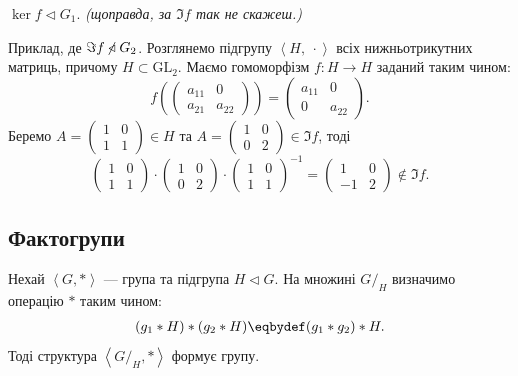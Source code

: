 \documentclass{math_library}
\begin{document}
\begin{corollary}
$\ker f \triangleleft G_1$. \textit{(щоправда, за $\Im f$ так не скажеш.)}
\end{corollary}

\begin{example}
Приклад, де $\Im f \centernot\triangleleft G_2$. Розглянемо підгрупу $\left<H,\ \cdot \right>$ всіх нижньотрикутних матриць, причому $H \subset \mathrm{GL}_2$. Маємо гомоморфізм $f \colon H \to H$ заданий таким чином:
\[
f\left( \begin{pmatrix}
a_{11} & 0 \\
a_{21} & a_{22}
\end{pmatrix} \right) = \begin{pmatrix}
a_{11} & 0 \\
0 & a_{22}
\end{pmatrix}.
\]
Беремо $A = \begin{pmatrix}
1 & 0 \\
1 & 1
\end{pmatrix} \in H$ та $A = \begin{pmatrix}
1 & 0 \\
0 & 2
\end{pmatrix} \in \Im f$, тоді
\[
\begin{pmatrix}
1 & 0 \\
1 & 1
\end{pmatrix} \cdot \begin{pmatrix}
1 & 0 \\
0 & 2
\end{pmatrix} \cdot \begin{pmatrix}
1 & 0 \\
1 & 1
\end{pmatrix}^{-1} = \begin{pmatrix}
1 & 0 \\
-1 & 2
\end{pmatrix} \not \in \Im f.
\]
\end{example}

\subsection{Фактогрупи}
\begin{theorem}
Нехай $\left< G,* \right>$ --- група та підгрупа $H \triangleleft G$. На множині $G/_H$ визначимо операцію $*$ таким чином:
\begin{align*}
(g_1*H) * (g_2*H) \eqbydef (g_1*g_2)*H.
\end{align*}
Тоді структура $\left< G/_H, * \right>$ формує групу.
\end{theorem}
\end{document}
